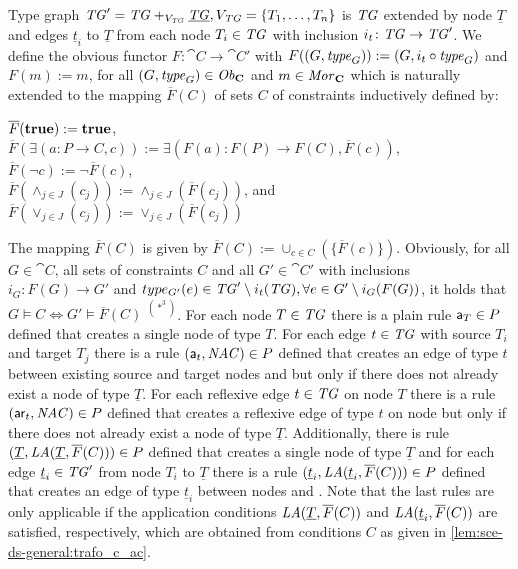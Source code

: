 Type graph $\mathit{TG}'=\mathit{TG} +_{V_\mathit{TG}} \underline{\mathit{TG}},V_\mathit{TG}=\{T_1,\ldots,T_n\}$ is $\mathit{TG}$ extended by node $\underline{T}$ and edges $\underline{t}_i$ to $\underline{T}$ from each node $T_i \in \mathit{TG}$ with inclusion $i_t\colon \mathit{TG} \to \mathit{TG}'$.
We define the obvious functor $F\colon \cat{C} \to \cat{C'}$ with $F((G,\mathit{type}_G)):=(G,i_t \circ \mathit{type}_G)$ and $F(m):=m$, for all $(G,\mathit{type}_G) \in \mathit{Ob}_\mathbf{C}$ and $m \in \mathit{Mor}_\mathbf{C}$ which is naturally extended to the mapping $\overline{F}(C)$ of sets $C$ of constraints inductively defined by:
\begin{center}
$\overline{F}(\textbf{true}):=\textbf{true}$,\\
$\overline{F}(\exists(a\colon P \to C,c)):=\exists(F(a)\colon F(P) \to F(C),\overline{F}(c))$,\\
$\overline{F}(\neg c):=\neg \overline{F}(c)$,\\
$\overline{F}(\wedge_{j \in J}(c_j)):=\wedge_{j \in J}(\overline{F}(c_j))$, and\\
$\overline{F}(\vee_{j \in J}(c_j)):=\vee_{j \in J}(\overline{F}(c_j))$
\end{center}
The mapping $\overline{F}(C)$ is given by $\overline{F}(C):=\cup_{c \in C}(\{\overline{F}(c)\})$.\thispagestyle{plain}
Obviously, for all $G \in \cat{C}$, all sets of constraints $C$ and all $G' \in \cat{C'}$ with inclusions $i_G\colon F(G) \to G'$ and $type_{G'}(e) \in \mathit{TG}' \setminus i_t(\mathit{TG}), \forall e \in G' \setminus i_G(F(G))$, it holds that $G \models C \Leftrightarrow G' \models \overline{F}(C)$ $^{(*^3)}$.
For each node $T \in \mathit{TG}$ there is a plain rule $\mathsf{a}_T\in P$ defined that creates a single node of type $T$.
For each edge $t \in \mathit{TG}$ with source $T_i$ and target $T_j$ there is a rule $(\mathsf{a}_t,\mathit{NAC}) \in P$ defined that creates an edge of type $t$ between existing source and target nodes  and  but only if there does not already exist a node of type $\underline{T}$.
For each reflexive edge $t \in \mathit{TG}$ on node $T$ there is a rule $(\mathsf{ar}_t,\mathit{NAC}) \in P$ defined that creates a reflexive edge of type $t$ on node  but only if there does not already exist a node of type $\underline{T}$.
Additionally, there is rule $(\underline{T},\mathit{LA}(\underline{T},\overline{F}(C))) \in P$ defined that creates a single node of type $\underline{T}$ and for each edge $\underline{t}_i \in \mathit{TG}'$ from node $T_i$ to $\underline{T}$ there is a rule $(\underline{t}_i,\mathit{LA}(\underline{t}_i,\overline{F}(C))) \in P$ defined that creates an edge of type $\underline{t}_i$ between nodes  and .
Note that the last rules are only applicable if the application conditions $\mathit{LA}(\underline{T},\overline{F}(C))$ and $\mathit{LA}(\underline{t}_i,\overline{F}(C))$ are satisfied, respectively, which are obtained from conditions $C$ as given in \cref{lem:sce-ds-general:trafo_c_ac}.
